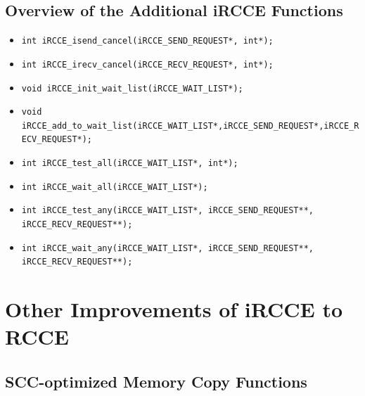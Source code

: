 \documentclass[fontsize=10pt, paper=a4, DIV12, pagesize=auto]{scrartcl}
\begin{document}
\subsection{Overview of the Additional iRCCE Functions}
\enlargethispage{0.5cm}
\begin{itemize}
  \item \texttt{int iRCCE\_isend\_cancel(iRCCE\_SEND\_REQUEST*, int*);}
	\item \texttt{int iRCCE\_irecv\_cancel(iRCCE\_RECV\_REQUEST*, int*);}
	\item \texttt{void iRCCE\_init\_wait\_list(iRCCE\_WAIT\_LIST*);}
	\item \texttt{void iRCCE\_add\_to\_wait\_list(iRCCE\_WAIT\_LIST*,iRCCE\_SEND\_REQUEST*,iRCCE\_RECV\_REQUEST*);}
	\item \texttt{int iRCCE\_test\_all(iRCCE\_WAIT\_LIST*, int*);}
	\item \texttt{int iRCCE\_wait\_all(iRCCE\_WAIT\_LIST*);}
	\item \texttt{int iRCCE\_test\_any(iRCCE\_WAIT\_LIST*, iRCCE\_SEND\_REQUEST**, iRCCE\_RECV\_REQUEST**);}
	\item \texttt{int iRCCE\_wait\_any(iRCCE\_WAIT\_LIST*, iRCCE\_SEND\_REQUEST**, iRCCE\_RECV\_REQUEST**);}
\end{itemize}

\newpage

\section{Other Improvements of iRCCE to RCCE}\label{sec:improvements}

\subsection{SCC-optimized Memory Copy Functions}\label{sec:improvements:memcpy}
\end{document}
